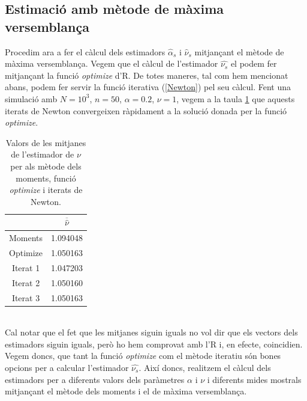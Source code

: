 \documentclass[12pt, catalan]{article}
\numberwithin{table}{section}
\numberwithin{figure}{section}
\numberwithin{equation}{section}
\begin{document}
\subsection{Estimació amb mètode de màxima versemblança}
Procedim ara a fer el càlcul dels estimadors $\hat{\alpha}_s$ i $\hat{\nu}_s$ mitjançant el mètode de màxima versemblança. Vegem que el càlcul de l'estimador $\hat{\nu_s}$ el podem fer mitjançant la funció \emph{optimize} d'R. De totes maneres, tal com hem mencionat abans, podem fer servir la funció iterativa (\ref{Newton}) pel seu càlcul.
Fent una simulació amb $N=10^3$, $n=50$, $\alpha=0.2$, $\nu=1$, vegem  a la taula \ref{OptimizeNewton} que aquests iterats de Newton convergeixen ràpidament a la solució donada per la funció \emph{optimize}.
\begin{table}[h]
\centering
\caption{Valors de les mitjanes de l'estimador de $\nu$ per als mètode dels moments, funció \emph{optimize} i iterats de Newton.}
\begin{tabular}{|c|c|}
\hline
         & $\overline{\hat{\nu}}$       \\ \hline
Moments  & 1.094048 \\ \hline
Optimize & 1.050163 \\ \hline
Iterat 1 & 1.047203 \\ \hline
Iterat 2 & 1.050160  \\ \hline
Iterat 3 & 1.050163 \\ \hline
\end{tabular}
\label{OptimizeNewton}
\end{table}
\\
Cal notar que el fet que les mitjanes siguin iguals no vol dir que els vectors dels estimadors siguin iguals, però ho hem comprovat amb l'R i, en efecte, coincidien. 
Vegem doncs, que tant la funció \emph{optimize} com el mètode iteratiu són bones opcions per a calcular l'estimador $\hat{\nu_s}$.
Així doncs, realitzem el càlcul dels estimadors per a diferents valors dels paràmetres $\alpha$ i $\nu$ i diferents mides mostrals mitjançant el mètode dels moments i el de màxima versemblança.
\end{document}
